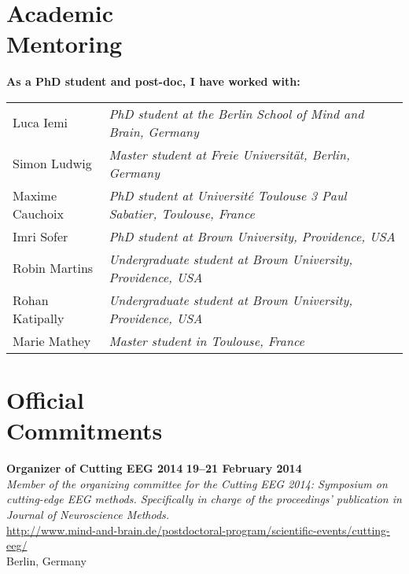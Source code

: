 \documentclass[margin,line]{resume}
\begin{document}
\begin{resume}
	\vspace{3mm}
    \section{\mysidestyle Academic\\Mentoring}
	
	\textbf{As a PhD student and post-doc, I have worked with:}\\
	\begin{tabular}{@{}ll} %
	Luca Iemi       & \textsl{PhD student at the Berlin School of Mind and Brain, Germany}\\
	Simon Ludwig    & \textsl{Master student at Freie Universität, Berlin, Germany}\\
	Maxime Cauchoix & \textsl{PhD student at Université Toulouse 3 Paul Sabatier, Toulouse, France}\\
	Imri Sofer      & \textsl{PhD student at Brown University, Providence, USA}\\
	Robin Martins   & \textsl{Undergraduate student at Brown University, Providence, USA} \\
	Rohan Katipally & \textsl{Undergraduate student at Brown University, Providence, USA} \\
	Marie Mathey    & \textsl{Master student in Toulouse, France}
	\end{tabular}
	


	\vspace{3mm}
    \section{\mysidestyle Official\\ Commitments} %
	
	\textbf{Organizer of Cutting EEG 2014} \hfill \textbf{19–21 February 2014}\\
	\textsl{Member of the organizing committee for the Cutting EEG 2014: Symposium on cutting-edge EEG methods. Specifically in charge of the proceedings' publication in Journal of Neuroscience Methods.}\\
	 \url{http://www.mind-and-brain.de/postdoctoral-program/scientific-events/cutting-eeg/}\\
	Berlin, Germany
	

\end{resume}
\end{document}
